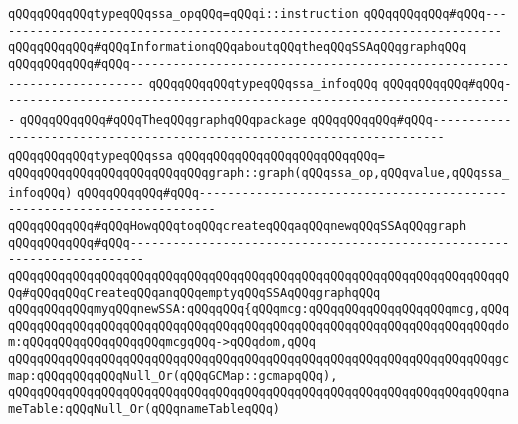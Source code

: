 \verb|qQQqqQQqqQQqtypeqQQqssa_opqQQq=qQQqi::instruction|\newline
\newline
\verb|qQQqqQQqqQQq#qQQq------------------------------------------------------------------------|\newline
\verb|qQQqqQQqqQQq#qQQqInformationqQQqaboutqQQqtheqQQqSSAqQQqgraphqQQq|\newline
\verb|qQQqqQQqqQQq#qQQq------------------------------------------------------------------------|\newline
\verb|qQQqqQQqqQQqtypeqQQqssa_infoqQQq|\newline
\newline
\verb|qQQqqQQqqQQq#qQQq------------------------------------------------------------------------|\newline
\verb|qQQqqQQqqQQq#qQQqTheqQQqgraphqQQqpackage|\newline
\verb|qQQqqQQqqQQq#qQQq------------------------------------------------------------------------|\newline
\verb|qQQqqQQqqQQqtypeqQQqssa|\newline
\verb|qQQqqQQqqQQqqQQqqQQqqQQqqQQq=|\newline
\verb|qQQqqQQqqQQqqQQqqQQqqQQqqQQqgraph::graph(qQQqssa_op,qQQqvalue,qQQqssa_infoqQQq)|\newline
\newline
\verb|qQQqqQQqqQQq#qQQq------------------------------------------------------------------------|\newline
\verb|qQQqqQQqqQQq#qQQqHowqQQqtoqQQqcreateqQQqaqQQqnewqQQqSSAqQQqgraph|\newline
\verb|qQQqqQQqqQQq#qQQq------------------------------------------------------------------------|\newline
\newline
\verb|qQQqqQQqqQQqqQQqqQQqqQQqqQQqqQQqqQQqqQQqqQQqqQQqqQQqqQQqqQQqqQQqqQQqqQQq#qQQqqQQqCreateqQQqanqQQqemptyqQQqSSAqQQqgraphqQQq|\newline
\verb|qQQqqQQqqQQqmyqQQqnewSSA:qQQqqQQq{qQQqmcg:qQQqqQQqqQQqqQQqqQQqmcg,qQQq|\newline
\verb|qQQqqQQqqQQqqQQqqQQqqQQqqQQqqQQqqQQqqQQqqQQqqQQqqQQqqQQqqQQqqQQqqQQqdom:qQQqqQQqqQQqqQQqqQQqmcgqQQq->qQQqdom,qQQq|\newline
\verb|qQQqqQQqqQQqqQQqqQQqqQQqqQQqqQQqqQQqqQQqqQQqqQQqqQQqqQQqqQQqqQQqqQQqgcmap:qQQqqQQqqQQqNull_Or(qQQqGCMap::gcmapqQQq),|\newline
\verb|qQQqqQQqqQQqqQQqqQQqqQQqqQQqqQQqqQQqqQQqqQQqqQQqqQQqqQQqqQQqqQQqqQQqnameTable:qQQqNull_Or(qQQqnameTableqQQq)|\newline
